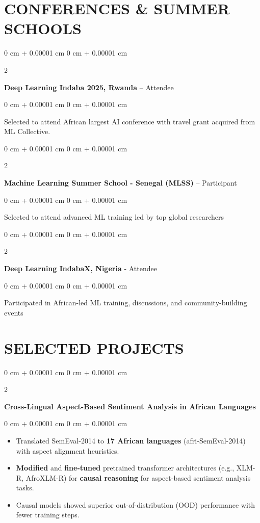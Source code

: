\documentclass[11pt, letterpaper]{article}
\newenvironment{onecolentry}{
    \begin{adjustwidth}{
        0 cm + 0.00001 cm
    }{
        0 cm + 0.00001 cm
    }
}{
    \end{adjustwidth}
} %
\newenvironment{twocolentry}[2][]{
    \onecolentry
    \def\secondColumn{#2}
    \setcolumnwidth{\fill, 4.5 cm}
    \begin{paracol}{2}
}{
    \switchcolumn \raggedleft \secondColumn
    \end{paracol}
    \endonecolentry
} %
\begin{document}
    \section{CONFERENCES \& SUMMER SCHOOLS}
        \begin{twocolentry}{
            2025
        }
            \textbf{Deep Learning Indaba 2025, Rwanda} – Attendee
        \end{twocolentry}
        \begin{onecolentry}
            Selected to attend African largest AI conference with travel grant acquired from ML Collective.
        \end{onecolentry}
        
        \vspace{0.2 cm}

        \begin{twocolentry}{
            2025
        }
            \textbf{Machine Learning Summer School - Senegal (MLSS)} – Participant
        \end{twocolentry}
        \begin{onecolentry}
            Selected to attend advanced ML training led by top global researchers
        \end{onecolentry}
        
        \vspace{0.2 cm}
        
        \begin{twocolentry}{
            2024
        }
            \textbf{Deep Learning IndabaX, Nigeria} - Attendee \end{twocolentry}
        \begin{onecolentry}
            Participated in African-led ML training, discussions, and community-building events
        \end{onecolentry}

    \section{SELECTED PROJECTS}
        \begin{twocolentry}{
            
        }
            \textbf{Cross-Lingual Aspect-Based Sentiment Analysis in African Languages}
        \end{twocolentry}
        \begin{onecolentry}
            \begin{itemize}
                \item[-] Translated SemEval-2014 to \textbf{17 African languages} (afri-SemEval-2014) with aspect alignment heuristics.
                \item[-] \textbf{Modified} and \textbf{fine-tuned} pretrained transformer architectures (e.g., XLM-R, AfroXLM-R) for \textbf{causal reasoning} for aspect-based sentiment analysis tasks.
                \item[-] Causal models showed superior out-of-distribution (OOD) performance with fewer training steps.
            \end{itemize}
        \end{onecolentry}
        
\end{document}
